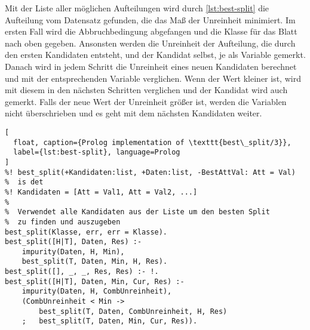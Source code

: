 Mit der Liste aller möglichen Aufteilungen wird durch \cref{lst:best-split} die Aufteilung vom Datensatz gefunden,
die das Maß der Unreinheit minimiert. Im ersten Fall wird die Abbruchbedingung abgefangen und die Klasse für das Blatt nach oben gegeben.
Ansonsten werden die Unreinheit der Aufteilung, die durch den ersten
Kandidaten entsteht, und der Kandidat selbst, je als Variable gemerkt. Danach wird in jedem Schritt die Unreinheit
eines neuen Kandidaten berechnet und mit der entsprechenden Variable verglichen. Wenn der Wert kleiner ist,
wird mit diesem in den nächsten Schritten verglichen und der Kandidat wird auch gemerkt. Falls der neue Wert
der Unreinheit größer ist, werden die Variablen nicht überschrieben und es geht mit dem nächsten Kandidaten weiter.

\begin{lstlisting}[
  float, caption={Prolog implementation of \texttt{best\_split/3}},
  label={lst:best-split}, language=Prolog
]
%! best_split(+Kandidaten:list, +Daten:list, -BestAttVal: Att = Val)
%  is det
%! Kandidaten = [Att = Val1, Att = Val2, ...]
%
%  Verwendet alle Kandidaten aus der Liste um den besten Split
%  zu finden und auszugeben
best_split(Klasse, err, err = Klasse).
best_split([H|T], Daten, Res) :-
    impurity(Daten, H, Min),
    best_split(T, Daten, Min, H, Res).
best_split([], _, _, Res, Res) :- !.
best_split([H|T], Daten, Min, Cur, Res) :-
    impurity(Daten, H, CombUnreinheit),
    (CombUnreinheit < Min ->
        best_split(T, Daten, CombUnreinheit, H, Res)
    ;   best_split(T, Daten, Min, Cur, Res)).
\end{lstlisting}

